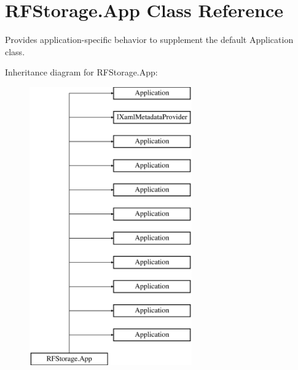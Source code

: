 \hypertarget{class_r_f_storage_1_1_app}{}\section{R\+F\+Storage.\+App Class Reference}
\label{class_r_f_storage_1_1_app}


Provides application-\/specific behavior to supplement the default Application class.  


Inheritance diagram for R\+F\+Storage.\+App\+:\begin{figure}[H]
\begin{center}
\leavevmode
\includegraphics[height=12.000000cm]{class_r_f_storage_1_1_app}
\end{center}
\end{figure}
